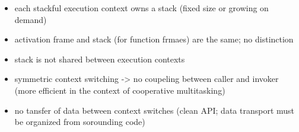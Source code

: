 \begin{itemize}
    \item   each stackful execution context owns a stack (fixed size or growing
            on demand)
    \item   activation frame and stack (for function frmaes) are the same; no
            distinction
    \item   stack is not shared between execution contexts
    \item   symmetric context switching -> no coupeling between caller and
            invoker (more efficient in the context of cooperative multitasking)
    \item   no tansfer of data between context switches (clean API; data transport
            must be organized from sorounding code)
\end{itemize}

